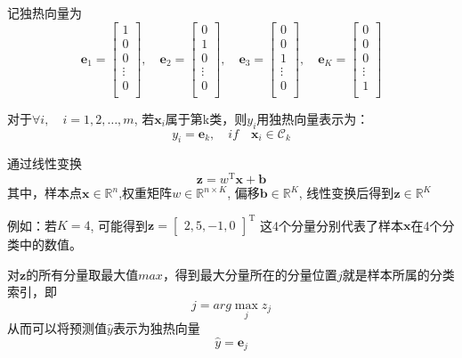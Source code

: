 \documentclass[withoutpreface,bwprint]{NoteBook}
\begin{document}
记独热向量为
$$
\mathbf{e}_1 = 
\begin{bmatrix} 
    1\\
    0\\
    0\\
    \vdots\\
    0\\
\end{bmatrix}
,\quad 
\mathbf{e}_2 = 
\begin{bmatrix} 
    0\\
    1\\
    0\\
    \vdots\\
    0\\
\end{bmatrix}
, \quad 
\mathbf{e}_3 =
\begin{bmatrix} 
    0\\
    0\\
    1\\
    \vdots\\
    0\\
\end{bmatrix}
, \quad 
\mathbf{e}_K = 
\begin{bmatrix} 
    0\\
    0\\
    0\\
    \vdots\\
    1\\
\end{bmatrix}
$$

对于$\forall  i, \quad i = 1,2, \dots, m$,
若$\mathbf{x}_i$属于第k类，则$y_i$用独热向量表示为：
$$
y_i = \mathbf{e}_k ,\quad if \quad \mathbf{x}_i \in \mathcal{C}_k
$$

通过线性变换
\begin{equation}
    \label{eq:线性变换}
    \mathbf{z} = w^\mathrm{T} \mathbf{x} + \mathbf{b}
\end{equation}
其中，样本点$\mathbf{x} \in \mathbb{R}^n$,权重矩阵$w \in \mathbb{R}^{n \times K} $, 
偏移$\mathbf{b} \in \mathbb{R}^{K}$,
线性变换后得到$\mathbf{z} \in \mathbb{R}^K$

例如：若$K=4$, 可能得到$\mathbf{z} = \begin{bmatrix}
    2, 5, -1,0 
\end{bmatrix}^\mathrm{T}$
这4个分量分别代表了样本$\mathbf{x}$在4个分类中的数值。

对$\mathbf{z}$的所有分量取最大值$max$，得到最大分量所在的分量位置$j$就是样本所属的分类索引，即
$$
j = arg \max_{j} z_j
$$
从而可以将预测值$\hat{y}$表示为独热向量
\begin{equation}
    \hat{y} = \mathbf{e}_j
\end{equation}
\end{document}
